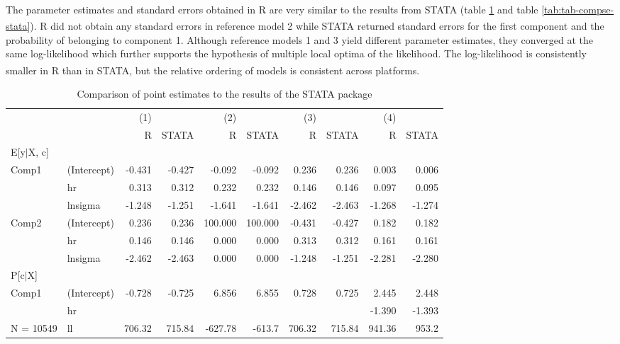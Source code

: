 \documentclass[
]{article}
\begin{document}
The parameter estimates and standard errors obtained in R are very similar to the results from STATA\textsuperscript{\textregistered} (table \ref{tab:tab-comp-stata} and table \ref{tab:tab-compse-stata}). R did not obtain any standard errors in reference model 2 while STATA\textsuperscript{\textregistered} returned standard errors for the first component and the probability of belonging to component 1. Although reference models 1 and 3 yield different parameter estimates, they converged at the same log-likelihood which further supports the hypothesis of multiple local optima of the likelihood. The log-likelihood is consistently smaller in R than in STATA\textsuperscript{\textregistered}, but the relative ordering of models is consistent across platforms.

\begin{table}[ht]
\centering
\caption{Comparison of point estimates to the results of the STATA package} 
\label{tab:tab-comp-stata}
\begin{tabular}{llrrrrrrrr}
  \hline
  &  & (1) &  & (2) &  & (3) &  & (4) &  \\ 
   &  & R & STATA & R & STATA & R & STATA & R & STATA \\ 
   \hline
E[y$|$X, c] &  &  &  &  &  &  &  &  &  \\ 
   \hline
Comp1 & (Intercept) & -0.431 & -0.427 & -0.092 & -0.092 & 0.236 & 0.236 & 0.003 & 0.006 \\ 
   & hr &  0.313 & 0.312 &  0.232 & 0.232 & 0.146 & 0.146 & 0.097 & 0.095 \\ 
   & lnsigma & -1.248 & -1.251 & -1.641 & -1.641 & -2.462 & -2.463 & -1.268 & -1.274 \\ 
  Comp2 & (Intercept) & 0.236 & 0.236 & 100.000 & 100.000 & -0.431 & -0.427 & 0.182 & 0.182 \\ 
   & hr & 0.146 & 0.146 &   0.000 & 0.000 &  0.313 & 0.312 & 0.161 & 0.161 \\ 
   & lnsigma & -2.462 & -2.463 & 0.000 & 0.000 & -1.248 & -1.251 & -2.281 & -2.280 \\ 
   \hline
P[c$|$X] &  &  &  &  &  &  &  &  &  \\ 
   \hline
Comp1 & (Intercept) & -0.728 & -0.725 & 6.856 & 6.855 & 0.728 & 0.725 &  2.445 & 2.448 \\ 
   & hr &  &  &  &  &  &  & -1.390 & -1.393 \\ 
   \hline
N = 10549 & ll & 706.32 & 715.84 & -627.78 & -613.7 & 706.32 & 715.84 & 941.36 & 953.2 \\ 
  \end{tabular}
\end{table}
\end{document}
